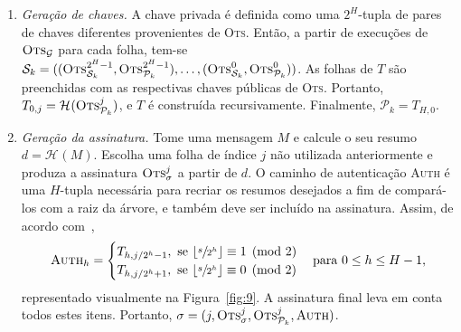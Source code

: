 \documentclass[12pt]{report}
\newcommand{\pk}{\mathcal{P}_k}
\newcommand{\sk}{\mathcal{S}_k}
\newcommand{\hash}[2][]{\mathcal{H}^{#1}(#2)}
\begin{document}
\begin{enumerate}

  \item[] \emph{Geração de chaves.} A chave privada é definida como uma
      $2^{H}$-tupla de pares de chaves diferentes provenientes de \textsc{Ots}.
        Então, a partir de execuções de $\textsc{Ots}_\mathcal{G}$ para cada
        folha, tem-se $\sk{} = ((\textsc{Ots}_{\sk{}}^{2^{H} - 1},
        \textsc{Ots}_{\pk{}}^{2^{H} - 1}), \dots, (\textsc{Ots}_{\sk{}}^{0},
        \textsc{Ots}_{\pk{}}^{0}))$. As folhas de $T$ são preenchidas com as
        respectivas chaves públicas de \textsc{Ots}. Portanto, $T_{0, j} =
        \hash{\textsc{Ots}_{\pk{}}^{j}}$, e $T$ é construída recursivamente.
        Finalmente, $\pk{} = T_{H,0}$.

  \item[] \emph{Geração da assinatura.} Tome uma mensagem $M$ e calcule o seu
      resumo $d = \hash{M}$. Escolha uma folha de índice $j$ não utilizada
        anteriormente e produza a assinatura $\textsc{Ots}_\sigma^{j}$ a
        partir de $d$. O caminho de autenticação \textsc{Auth} é
        uma $H$-tupla necessária para recriar os resumos desejados a fim de
        compará-los com a raiz da árvore, e também deve ser incluído na
        assinatura. Assim, de acordo com~\cite{Bernstein:2008:PQC:1522375},
        \begin{equation}
            \textsc{Auth}_h =
            \begin{cases}
                T_{h, j / 2^h  - 1}, \text{ se } \lfloor \sfrac{s}{2^h} \rfloor \equiv 1 \pmod{2} \\
                T_{h, j / 2^h  + 1}, \text{ se } \lfloor \sfrac{s}{2^h} \rfloor \equiv 0 \pmod{2}
            \end{cases} \text{para } 0 \leq h \leq H - 1,
        \end{equation}
        representado visualmente na Figura~\ref{fig:9}. A assinatura
        final leva em conta todos estes itens. Portanto, $\sigma = (j,
        \textsc{Ots}_\sigma^{j}, \textsc{Ots}_{\pk{}}^{j}, \textsc{Auth})$.


\end{enumerate}
\end{document}
